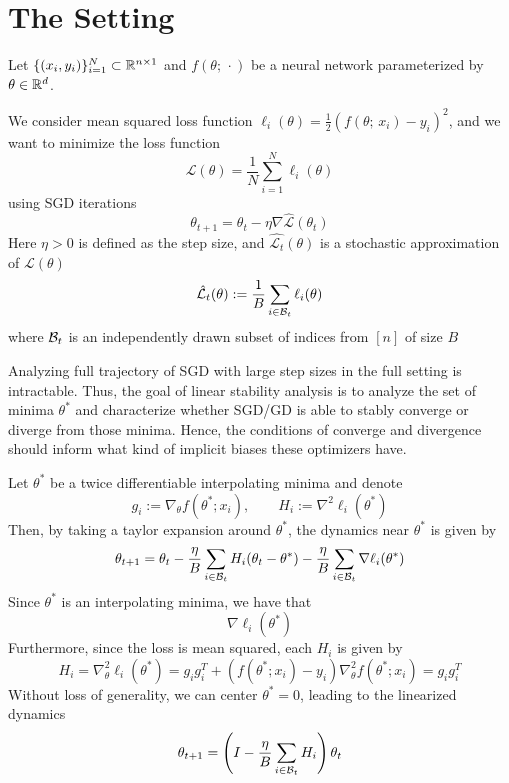 \section{The Setting}
Let $\{(x_i, y_i)\}_{i=1}^N \subset \mathbb{R}^{n\times 1}$ and $f(\theta;\, \cdot)$ be a neural network parameterized by $\theta \in \mathbb{R}^d$.

We consider mean squared loss function $\ell_i(\theta) = \frac{1}{2}(f(\theta;\, x_i) - y_i)^2$, and we want to minimize the loss function 
\begin{equation}
    \mathcal{L}(\theta) = \frac{1}{N}\sum_{i=1}^N \ell_i(\theta)
\end{equation}
using SGD iterations
\begin{equation}
    \theta_{t+1} = \theta_t - \eta \nabla \hat{\mathcal{L}}(\theta_t) 
\end{equation}
Here $\eta>0$ is defined as the step size, and $\hat{\mathcal{L}_t}(\theta)$ is a stochastic approximation of $\mathcal{L}(\theta)$
\begin{equation}
    \hat{\mathcal{L}}_t(\theta):= \frac{1}{B}\sum_{i\in \mathcal{B}_t}\ell_i(\theta)
\end{equation}
where $\mathcal{B}_t$ is an independently drawn subset of indices from $[n]$ of size $B$

Analyzing full trajectory of SGD with large step sizes in the full setting is intractable. Thus, the goal of linear stability analysis is to analyze the set of minima $\theta^*$ and characterize whether SGD/GD is able to stably converge or diverge from those minima. Hence, the conditions of converge and divergence should inform what kind of implicit biases these optimizers have.

\begin{definition}
Let $\theta^*$ be a twice differentiable interpolating minima and denote
\begin{equation}
g_i := \nabla_\theta f(\theta^*; x_i), \qquad H_i :=\nabla^2\ell_i(\theta^*)
\end{equation}
Then, by taking a taylor expansion around $\theta^*$, the dynamics near $\theta^*$ is given by
\begin{equation}
    \theta_{t+1} = \theta_t - \frac{\eta}{B}\sum_{i\in \mathcal{B}_t} H_i(\theta_t - \theta^*) - \frac{\eta}{B}\sum_{i\in \mathcal{B}_t}\nabla \ell_i(\theta^*)
\end{equation}
Since $\theta^*$ is an interpolating minima, we have that 
\begin{equation}
    \nabla \ell_i(\theta^*)
\end{equation}
Furthermore, since the loss is mean squared, each $H_i$ is given by
\[H_i = \nabla^2_\theta \ell_i(\theta^*) = g_ig_i^T + (f(\theta^*; x_i) - y_i)\nabla^2_\theta f(\theta^*;x_i) = g_ig_i^T\]
Without loss of generality, we can center $\theta^* = 0$, leading to the linearized dynamics
\begin{equation}
    \theta_{t+1} = \left(I - \frac{\eta}{B}\sum_{i\in \mathcal{B}_t}H_i \right)\theta_t
\end{equation}
\end{definition}

